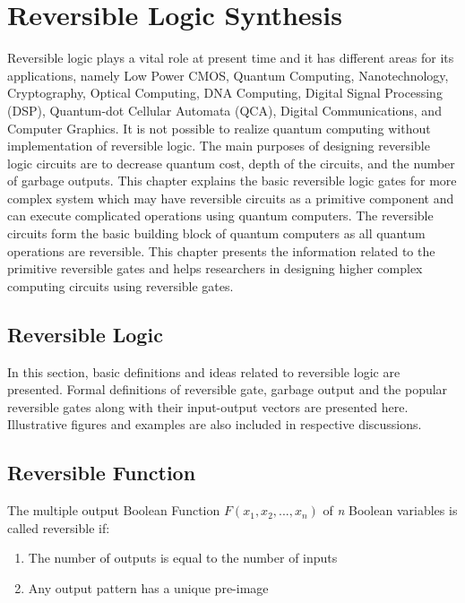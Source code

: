 \chapter{Reversible Logic Synthesis}
\label{ch:part1_chapter1}


Reversible logic plays a vital  role  at present time and it has different areas for its applications, namely Low Power CMOS, Quantum Computing, Nanotechnology, Cryptography,
Optical Computing, DNA  Computing, Digital Signal  Processing (DSP), Quantum-dot Cellular Automata (QCA),  Digital Communications, and Computer Graphics. It is not possible to realize quantum computing without implementation of reversible logic. The main purposes of designing reversible logic circuits are to decrease quantum cost, depth of the circuits, and the number of garbage outputs.%
This chapter explains the basic reversible logic gates for more complex system which may have reversible circuits as a primitive component and can execute complicated operations using quantum computers. The reversible circuits form the basic building block of quantum computers as all quantum operations are reversible. This chapter presents the information related to the primitive reversible gates and helps researchers in designing higher complex computing circuits using reversible gates.
 
 
\section{Reversible Logic}
 In this section, basic definitions and ideas related to reversible logic are presented. Formal definitions of reversible gate, garbage output and the popular reversible gates along with their input-output vectors are presented here.
 Illustrative figures and examples are also included in respective discussions.
 
\section{Reversible Function}
The multiple output Boolean Function $F(x_1, x_2, ...,x_n)$ of \textit{n} Boolean variables is called reversible if:
\begin{enumerate}
	\item The number of outputs is equal to the number of inputs
	\item Any output pattern has a unique pre-image
\end{enumerate}


